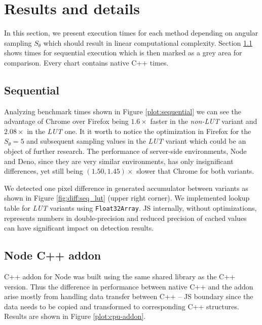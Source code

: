 \section{Results and details}\label{sec:results}
In this section, we present execution times for each method depending on angular sampling $S_\theta$ which should result in linear computational complexity. Section \ref{sec:results:sequential} shows times for sequential execution which is then marked as a grey area for comparison. Every chart contains native C++ times. 

\subsection{Sequential}\label{sec:results:sequential}

Analyzing benchmark times shown in Figure \ref{plot:sequential} we can see the advantage of Chrome over Firefox being $1.6\times$ faster in the \textit{non-LUT} variant and $2.08\times$ in the \textit{LUT} one. It it worth to notice the optimization in Firefox for the $S_\theta=5$ and subsequent sampling values in the \textit{LUT} variant which could be an object of further research. The performance of server-side environments, Node and Deno, since they are very similar environments, has only insignificant differences, yet still being $(1.50, 1.45)\times$ slower that Chrome for both variants.




We detected one pixel difference in generated accumulator between variants as shown in Figure \ref{fig:diff:seq_lut} (upper right corner). We implemented lookup table for \textit{LUT} variants using \texttt{Float32Array}. JS internally, without optimizations, represents numbers in double-precision and reduced precision of cached values can have significant impact on detection results.




\subsection{Node C++ addon}\label{sec:results:cpp-addon}

C++ addon for Node was built using the same shared library as the C++ version. Thus the difference in performance between native C++ and the addon arise mostly from handling data transfer between C++ -- JS boundary since the data needs to be copied and transformed to corresponding C++ structures. Results are shown in Figure \ref{plot:cpu-addon}.

